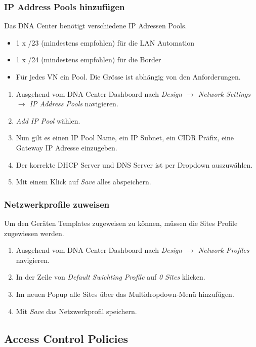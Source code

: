 \subsubsection{IP Address Pools hinzufügen}
Das DNA Center benötigt verschiedene IP Adressen Pools. 
\begin{itemize}
	\item 1 x /23 (mindestens empfohlen) für die LAN Automation
	\item 1 x /24 (mindestens empfohlen) für die Border
	\item Für jedes VN ein Pool. Die Grösse ist abhängig von den Anforderungen.
\end{itemize}
\begin{enumerate}
	\item Ausgehend vom DNA Center Dashboard nach \textit{Design $\rightarrow$ Network Settings $\rightarrow$ IP Address Pools} navigieren. 
	\item \textit{Add IP Pool} wählen. 
	\item Nun gilt es einen IP Pool Name, ein IP Subnet, ein CIDR Präfix, eine Gateway IP Adresse einzugeben.
	\item Der korrekte DHCP Server und DNS Server ist per Dropdown auszuwählen.
	\item Mit einem Klick auf \textit{Save} alles abspeichern.
\end{enumerate}

\subsubsection{Netzwerkprofile zuweisen}
Um den Geräten Templates zugeweisen zu können, müssen die Sites Profile zugewiesen werden.
\begin{enumerate}
	\item Ausgehend vom DNA Center Dashboard nach \textit{Design $\rightarrow$ Network Profiles} navigieren. 
	\item In der Zeile von \textit{Default Swichting Profile} auf \textit{0 Sites} klicken. 
	\item Im neuen Popup alle Sites über das Multidropdown-Menü hinzufügen.
	\item Mit \textit{Save} das Netzwerkprofil speichern.
\end{enumerate}

\subsection{Access Control Policies}

